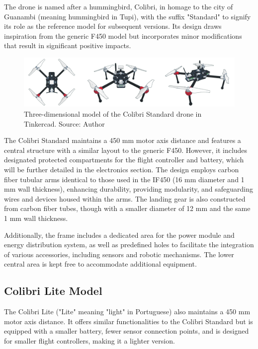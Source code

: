 \documentclass[conference]{IEEEtran}
\begin{document}
The drone is named after a hummingbird, Colibri, in homage to the city of Guanambi (meaning hummingbird in Tupi), with the suffix "Standard" to signify its role as the reference model for subsequent versions. Its design draws inspiration from the generic F450 model but incorporates minor modifications that result in significant positive impacts.

\begin{figure}[!htb]
    \centering
    \includegraphics[scale=0.14]{img/Colibri-standard.png} 
    \caption{Three-dimensional model of the Colibri Standard drone in Tinkercad. Source: Author}
    \label{fig:my_label}
\end{figure}

The Colibri Standard maintains a 450 mm motor axis distance and features a central structure with a similar layout to the generic F450. However, it includes designated protected compartments for the flight controller and battery, which will be further detailed in the electronics section. The design employs carbon fiber tubular arms identical to those used in the IF450 (16 mm diameter and 1 mm wall thickness), enhancing durability, providing modularity, and safeguarding wires and devices housed within the arms. The landing gear is also constructed from carbon fiber tubes, though with a smaller diameter of 12 mm and the same 1 mm wall thickness.

Additionally, the frame includes a dedicated area for the power module and energy distribution system, as well as predefined holes to facilitate the integration of various accessories, including sensors and robotic mechanisms. The lower central area is kept free to accommodate additional equipment.

\subsection{Colibri Lite Model}

The Colibri Lite ("Lite" meaning "light" in Portuguese) also maintains a 450 mm motor axis distance. It offers similar functionalities to the Colibri Standard but is equipped with a smaller battery, fewer sensor connection points, and is designed for smaller flight controllers, making it a lighter version.
\end{document}
